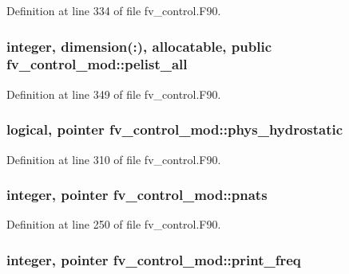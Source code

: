 Definition at line 334 of file fv\-\_\-control.\-F90.

\subsubsection[{pelist\-\_\-all}]{\setlength{\rightskip}{0pt plus 5cm}integer, dimension(\-:), allocatable, public fv\-\_\-control\-\_\-mod\-::pelist\-\_\-all}\label{classfv__control__mod_acb8e6baca36aa5140d2d15258e1cf1d6}


Definition at line 349 of file fv\-\_\-control.\-F90.

\subsubsection[{phys\-\_\-hydrostatic}]{\setlength{\rightskip}{0pt plus 5cm}logical, pointer fv\-\_\-control\-\_\-mod\-::phys\-\_\-hydrostatic\hspace{0.3cm}{\ttfamily [private]}}\label{classfv__control__mod_acb8e0fa14bd650f1480f4e06e3ef8db5}


Definition at line 310 of file fv\-\_\-control.\-F90.

\subsubsection[{pnats}]{\setlength{\rightskip}{0pt plus 5cm}integer, pointer fv\-\_\-control\-\_\-mod\-::pnats\hspace{0.3cm}{\ttfamily [private]}}\label{classfv__control__mod_acc1391e246a9a26aebf562ac3ab8232e}


Definition at line 250 of file fv\-\_\-control.\-F90.

\subsubsection[{print\-\_\-freq}]{\setlength{\rightskip}{0pt plus 5cm}integer, pointer fv\-\_\-control\-\_\-mod\-::print\-\_\-freq\hspace{0.3cm}{\ttfamily [private]}}\label{classfv__control__mod_ac0fcc8e15fdfcefc0e0e93e830b44748}


